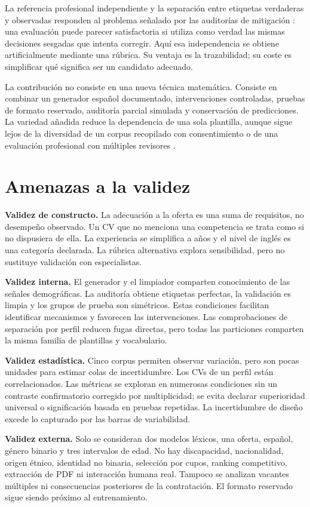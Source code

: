 La referencia profesional independiente y la separación entre etiquetas verdaderas y observadas responden al problema señalado por las auditorías de mitigación \cite{sariola2026}: una evaluación puede parecer satisfactoria si utiliza como verdad las mismas decisiones sesgadas que intenta corregir. Aquí esa independencia se obtiene artificialmente mediante una rúbrica. Su ventaja es la trazabilidad; su coste es simplificar qué significa ser un candidato adecuado.

La contribución no consiste en una nueva técnica matemática. Consiste en combinar un generador español documentado, intervenciones controladas, pruebas de formato reservado, auditoría parcial simulada y conservación de predicciones. La variedad añadida reduce la dependencia de una sola plantilla, aunque sigue lejos de la diversidad de un corpus recopilado con consentimiento o de una evaluación profesional con múltiples revisores \cite{saldivar2025}.

\section{Amenazas a la validez}
\textbf{Validez de constructo.} La adecuación a la oferta es una suma de requisitos, no desempeño observado. Un CV que no menciona una competencia se trata como si no dispusiera de ella. La experiencia se simplifica a años y el nivel de inglés es una categoría declarada. La rúbrica alternativa explora sensibilidad, pero no sustituye validación con especialistas.

\textbf{Validez interna.} El generador y el limpiador comparten conocimiento de las señales demográficas. La auditoría obtiene etiquetas perfectas, la validación es limpia y los grupos de prueba son simétricos. Estas condiciones facilitan identificar mecanismos y favorecen las intervenciones. Las comprobaciones de separación por perfil reducen fugas directas, pero todas las particiones comparten la misma familia de plantillas y vocabulario.

\textbf{Validez estadística.} Cinco corpus permiten observar variación, pero son pocas unidades para estimar colas de incertidumbre. Los CVs de un perfil están correlacionados. Las métricas se exploran en numerosas condiciones sin un contraste confirmatorio corregido por multiplicidad; se evita declarar superioridad universal o significación basada en pruebas repetidas. La incertidumbre de diseño excede lo capturado por las barras de variabilidad.

\textbf{Validez externa.} Solo se consideran dos modelos léxicos, una oferta, español, género binario y tres intervalos de edad. No hay discapacidad, nacionalidad, origen étnico, identidad no binaria, selección por cupos, ranking competitivo, extracción de PDF ni interacción humana real. Tampoco se analizan vacantes múltiples ni consecuencias posteriores de la contratación. El formato reservado sigue siendo próximo al entrenamiento.

